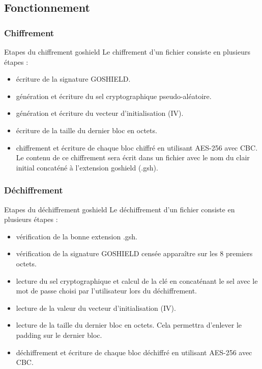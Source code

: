 \documentclass{beamer}
\begin{document}
\subsection{Fonctionnement}

\subsubsection{Chiffrement}

\begin{frame}
\begin{block}{Etapes du chiffrement goshield} 
	Le chiffrement d’un fichier consiste en plusieurs étapes :
	\begin{itemize}
	[circle]
	\item écriture de la signature GOSHIELD.
	\item génération et écriture du sel cryptographique pseudo-aléatoire.
	\item génération et écriture du vecteur d’initialisation (IV).
	\item écriture de la taille du dernier bloc en octets.
	\item chiffrement et écriture de chaque bloc chiffré en utilisant AES-256 avec CBC. Le contenu de ce chiffrement sera écrit dans un fichier avec le nom du clair initial concaténé à l’extension goshield (.gsh).
	\end{itemize}
	
\end{block}
\end{frame}

\subsubsection{Déchiffrement}

\begin{frame}
\begin{block}{Etapes du déchiffrement goshield} 
	Le déchiffrement d’un fichier consiste en plusieurs étapes :
	\begin{itemize}
		[circle]
		
		\item vérification de la bonne extension .gsh.
		\item vérification de la signature GOSHIELD censée apparaître sur les 8 premiers octets.
		\item lecture du sel cryptographique et calcul de la clé en concaténant le sel avec le mot de passe choisi par l’utilisateur lors du déchiffrement. 
		\item lecture de la valeur du vecteur d’initialisation (IV).
		\item lecture de la taille du dernier bloc en octets. Cela permettra d’enlever le padding sur le dernier bloc.
		\item déchiffrement et écriture de chaque bloc déchiffré en utilisant AES-256 avec CBC. 
	\end{itemize}
	
\end{block}
\end{frame}
\end{document}
